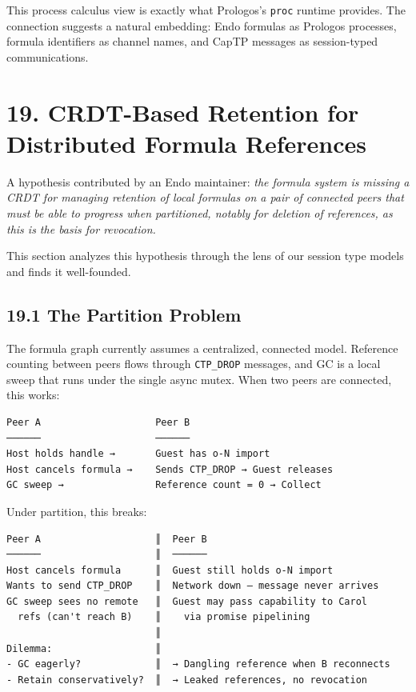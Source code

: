 \documentclass[11pt]{article}
\begin{document}
This process calculus view is exactly what Prologos's \texttt{proc} runtime
provides. The connection suggests a natural embedding: Endo formulas as
Prologos processes, formula identifiers as channel names, and CapTP messages
as session-typed communications.
\section{19. CRDT-Based Retention for Distributed Formula References}
\label{sec:org5526901}

A hypothesis contributed by an Endo maintainer: \emph{the formula system is
missing a CRDT for managing retention of local formulas on a pair of
connected peers that must be able to progress when partitioned, notably for
deletion of references, as this is the basis for revocation.}

This section analyzes this hypothesis through the lens of our session type
models and finds it well-founded.
\subsection{19.1 The Partition Problem}
\label{sec:org54ee6d6}

The formula graph currently assumes a centralized, connected model.
Reference counting between peers flows through \texttt{CTP\_DROP} messages, and GC
is a local sweep that runs under the single async mutex. When two peers are
connected, this works:

\begin{verbatim}
Peer A                    Peer B
──────                    ──────
Host holds handle →       Guest has o-N import
Host cancels formula →    Sends CTP_DROP → Guest releases
GC sweep →                Reference count = 0 → Collect
\end{verbatim}

Under partition, this breaks:

\begin{verbatim}
Peer A                    ║  Peer B
──────                    ║  ──────
Host cancels formula      ║  Guest still holds o-N import
Wants to send CTP_DROP    ║  Network down — message never arrives
GC sweep sees no remote   ║  Guest may pass capability to Carol
  refs (can't reach B)    ║    via promise pipelining
                          ║
Dilemma:                  ║
- GC eagerly?             ║  → Dangling reference when B reconnects
- Retain conservatively?  ║  → Leaked references, no revocation
\end{verbatim}
\end{document}
